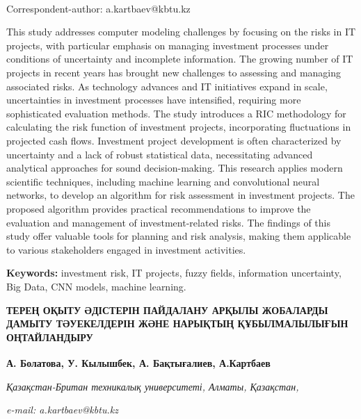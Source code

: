 {{\bfseries \textsuperscript{\envelope }}Correspondent-author: a.kartbaev@kbtu.kz

This study addresses computer modeling challenges by focusing on the
risks in IT projects, with particular emphasis on managing investment
processes under conditions of uncertainty and incomplete information.
The growing number of IT projects in recent years has brought new
challenges to assessing and managing associated risks. As technology
advances and IT initiatives expand in scale, uncertainties in investment
processes have intensified, requiring more sophisticated evaluation
methods. The study introduces a RIC methodology for calculating the risk
function of investment projects, incorporating fluctuations in projected
cash flows. Investment project development is often characterized by
uncertainty and a lack of robust statistical data, necessitating
advanced analytical approaches for sound decision-making. This research
applies modern scientific techniques, including machine learning and
convolutional neural networks, to develop an algorithm for risk
assessment in investment projects. The proposed algorithm provides
practical recommendations to improve the evaluation and management of
investment-related risks. The findings of this study offer valuable
tools for planning and risk analysis, making them applicable to various
stakeholders engaged in investment activities.

{\bfseries Keywords:} investment risk, IT projects, fuzzy fields,
information uncertainty, Big Data, CNN models, machine learning.

{\bfseries ТЕРЕҢ ОҚЫТУ ӘДІСТЕРІН ПАЙДАЛАНУ АРҚЫЛЫ ЖОБАЛАРДЫ ДАМЫТУ
ТӘУЕКЕЛДЕРІН ЖӘНЕ НАРЫҚТЫҢ ҚҰБЫЛМАЛЫЛЫҒЫН ОҢТАЙЛАНДЫРУ}

{\bfseries А. Болатова, У. Кылышбек, А. Бақтығалиев,
А.Картбаев\textsuperscript{\envelope }}

\emph{Қазақстан-Британ техникалық университеті, Алматы, Қазақстан,}

\emph{e-mail: a.kartbaev@kbtu.kz}

}
